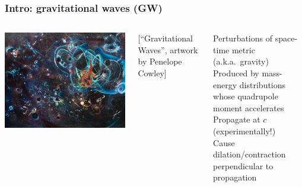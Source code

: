 \documentclass[aspectratio=169]{beamer}
\begin{document}
\begin{frame}
 \frametitle{Intro: gravitational waves (GW)}

 \begin{columns}
 
    \centering
    \includegraphics[height=0.9\textheight]{figures/GW-Penelope-Cowley.jpg}

    \tiny [``Gravitational Waves'', artwork by Penelope Cowley]

 
 \centering
 
 \alert{Perturbations} of space-time metric (a.k.a.~gravity)\\[10pt]
 
 Produced by mass-energy distributions whose \alert{quadrupole} moment accelerates\\[10pt]
 
 Propagate at \alert{$c$} (experimentally!)\\[10pt]
 
 Cause dilation/contraction \alert{perpendicular} to propagation\\[10pt]
 
 \end{columns}

\end{frame}
\end{document}

